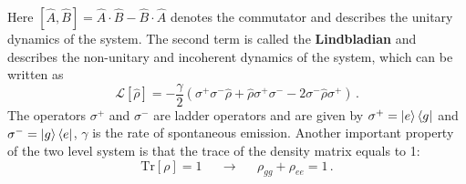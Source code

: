 Here $\left[\hat{A},\hat{B}\right] = \hat{A} \cdot\hat{B} - \hat{B} \cdot\hat{A}$ denotes the commutator and describes the unitary dynamics of the system. The second term is called the \textbf{Lindbladian} and describes the non-unitary and incoherent dynamics of the system, which can be written as
\begin{equation}\label{lindbladian}
    \mathcal{L}[\hat{\rho}] = -\frac{\gamma}{2} (\sigma^+ \sigma^- \hat{\rho} +\hat{\rho}\sigma^+ \sigma^- -2\sigma^- \hat{\rho}\sigma^+  )\,.
\end{equation}
The operators $\sigma^+$ and $\sigma^-$ are ladder operators and are given by $\sigma^+ = \ket{e}\bra{g}$ and  $\sigma^- = \ket{g}\bra{e}$, $\gamma$ is the rate of spontaneous emission. Another important property of the two level system is that the trace of the density matrix equals to 1:
\begin{equation}
    \mathrm{Tr}[\rho] = 1 \;\;\;\;\;\longrightarrow\;\;\;\;\; \rho_{gg} + \rho_{ee} = 1\, .
\end{equation}

